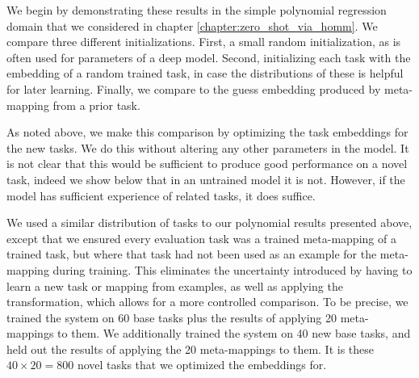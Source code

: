 We begin by demonstrating these results in the simple polynomial regression domain that we considered in chapter \ref{chapter:zero_shot_via_homm}. We compare three different initializations. First, a small random initialization, as is often used for parameters of a deep model. Second, initializing each task with the embedding of a random trained task, in case the distributions of these is helpful for later learning. Finally, we compare to the guess embedding produced by meta-mapping from a prior task. \par 
As noted above, we make this comparison by optimizing the task embeddings for the new tasks. We do this without altering any other parameters in the model. It is not clear that this would be sufficient to produce good performance on a novel task, indeed we show below that in an untrained model it is not. However, if the model has sufficient experience of related tasks, it does suffice. \par 
We used a similar distribution of tasks to our polynomial results presented above, except that we ensured every evaluation task was a trained meta-mapping of a trained task, but where that task had not been used as an example for the meta-mapping during training. This eliminates the uncertainty introduced by having to learn a new task or mapping from examples, as well as applying the transformation, which allows for a more controlled comparison. To be precise, we trained the system on 60 base tasks plus the results of applying 20 meta-mappings to them. We additionally trained the system on 40 new base tasks, and held out the results of applying the 20 meta-mappings to them. It is these \(40 \times 20 = 800\) novel tasks that we optimized the embeddings for. \par 
